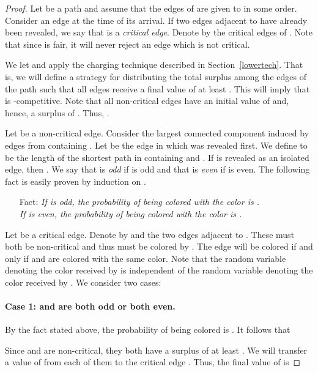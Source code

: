 \documentclass[smallextended]{svjour3}
\begin{document}
\begin{proof}
Let  be a path and assume that the edges of  are given to  in some order.
Consider an edge  at the time of its arrival. If two edges adjacent to  have already been revealed, we say that  is a \emph{critical edge}. Denote by  the critical edges of . Note that since  is fair, it will never reject an edge which is not critical.

We let  and apply the charging technique described in Section~\ref{lowertech}. That is, we will define a strategy for distributing the total surplus among the edges of the path such that all edges receive a final value of at least . This will imply that  is -competitive. Note that all non-critical edges have an initial value of  and, hence, a surplus of . Thus, .

Let  be a non-critical edge. Consider the largest connected component  induced by edges from  containing . Let  be the edge in  which was revealed first. We define  to be the length of the shortest path in  containing  and . If  is revealed as an isolated edge, then . We say that  is \emph{odd} if  is odd and that  is \emph{even} if  is even.
The following fact is easily proven by induction on . 

\begin{enumerate}[Fact:]
\item[Fact:] {\em If  is odd, the probability of  being colored with the color  is .\\ If  is even, the probability of  being colored with the color  is .} 
\end{enumerate}

Let  be a critical edge. Denote by  and  the two edges adjacent to . These must both be non-critical and thus must be colored by . The edge  will be colored if and only if  and  are colored with the same color. Note that the random variable denoting the color received by  is independent of the random variable denoting the color received by . We consider two cases:

\paragraph{Case 1:  and  are both odd or both even.} By the fact stated above, the probability of  being colored is . It follows that 
  
Since  and  are non-critical, they both have a surplus of at least . We will transfer a value of  from each of them to the critical edge . Thus, the final value of  is 




\end{proof}
\end{document}
